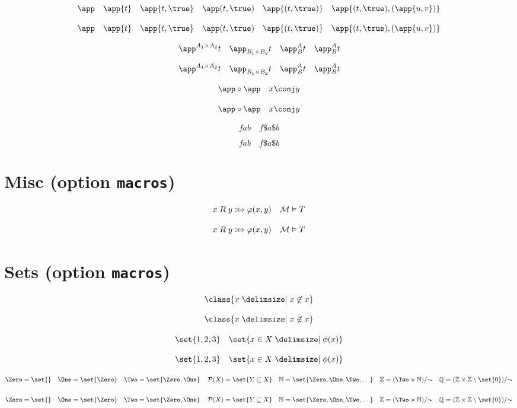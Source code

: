\documentclass{article}
\begin{document}
\begin{verbatim*}
\[
\app\quad
\app{t}\quad
\app{t,\true}\quad
\app(t,\true)\quad
\app{(t,\true)}\quad
\app{(t,\true),(\app{u,v})}
\]
\end{verbatim*}
%
\[
  \app              \quad
  \app{t}           \quad
  \app{t,\true}     \quad
  \app(t,\true)     \quad
  \app{(t,\true)} \quad
  \app{(t,\true),(\app{u,v})}
\]

\begin{verbatim*}
\[
\app^{A_1\times A_2}{t}\quad
\app_{B_1\times B_2}{t}\quad
\app^A_B{t}\quad
\app_B^A{t}
\]
\end{verbatim*}
%
\[
  \app^{A_1 \times A_2}{t} \quad
  \app_{B_1 \times B_2}{t} \quad
  \app^A_B{t}              \quad
  \app_B^A{t}
\]

\begin{verbatim*}
\[
\app \circ \app\quad
x \conj y
\]
\end{verbatim*}
%
\[
  \app \circ \app\quad
  x \conj y
\]

\begin{verbatim*}
\[
f a b\quad
f\$a\$b
\]
\end{verbatim*}
%
\[
  f a b \quad
  f\$a\$b
\]

\section{Misc (option \texttt{macros})}

\begin{verbatim*}
\[
x\mathrel{R}y\coloniff\varphi(x,y)\quad
\Mod[M]\vDash T
\]
\end{verbatim*}
%
\[
  x \mathrel{R} y \coloniff \varphi(x,y) \quad
  \Mod[M] \vDash T
\]

\section{Sets (option \texttt{macros})}

\begin{verbatim*}
\[
\class{x\given x\not\in x}
\]
\end{verbatim*}
%
\[
  \class{ x \given x \not\in x }
\]

\begin{verbatim*}
\[
\set{1,2,3}\quad
\set{x\in X\given\phi(x)}
\]
\end{verbatim*}
%
\[
  \set{ 1, 2, 3 } \quad
  \set{ x \in X \given \phi(x) }
\]

\begin{verbatim*}
\[
\Zero =\set{}\quad
\One =\set{\Zero}\quad
\Two =\set{\Zero,\One}\quad
\Powerset(X)=\set{Y\subseteq X}\quad
\Nats =\set{\Zero,\One,\Two,\ldots}\quad
\Ints =\Quot{(\Two\times\Nats)}{{\sim}}\quad
\Rats =\Quot{(\Ints\times\Ints\setminus\set{0})}{{\sim}}
\]
\end{verbatim*}
%
\[
  \Zero        = \set{ } \quad
  \One         = \set{ \Zero } \quad
  \Two         = \set{ \Zero, \One } \quad
  \Powerset(X) = \set{ Y \subseteq X } \quad
  \Nats        = \set{ \Zero, \One, \Two,\ldots } \quad
  \Ints        = \Quot{(\Two  \times \Nats)}{{\sim}} \quad
  \Rats        = \Quot{(\Ints \times \Ints \setminus \set{ 0 })}{{\sim}}
\]
\end{document}
